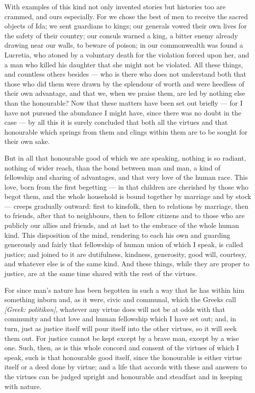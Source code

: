  With examples of this kind not only invented stories but histories too are crammed, and ours especially. For we chose the best of men to receive the sacred objects of Ida; we sent guardians to kings; our generals vowed their own lives for the safety of their country; our consuls warned a king, a bitter enemy already drawing near our walls, to beware of poison; in our commonwealth was found a Lucretia, who atoned by a voluntary death for the violation forced upon her, and a man who killed his daughter that she might not be violated. All these things, and countless others besides — who is there who does not understand both that those who did them were drawn by the splendour of worth and were heedless of their own advantage, and that we, when we praise them, are led by nothing else than the honourable? Now that these matters have been set out briefly — for I have not pursued the abundance I might have, since there was no doubt in the case — by all this it is surely concluded that both all the virtues and that honourable which springs from them and clings within them are to be sought for their own sake.

 But in all that honourable good of which we are speaking, nothing is so radiant, nothing of wider reach, than the bond between man and man, a kind of fellowship and sharing of advantages, and that very love of the human race. This love, born from the first begetting — in that children are cherished by those who begot them, and the whole household is bound together by marriage and by stock — creeps gradually outward: first to kinsfolk, then to relations by marriage, then to friends, after that to neighbours, then to fellow citizens and to those who are publicly our allies and friends, and at last to the embrace of the whole human kind. This disposition of the mind, rendering to each his own and guarding generously and fairly that fellowship of human union of which I speak, is called justice; and joined to it are dutifulness, kindness, generosity, good will, courtesy, and whatever else is of the same kind. And these things, while they are proper to justice, are at the same time shared with the rest of the virtues.

 For since man's nature has been begotten in such a way that he has within him something inborn and, as it were, civic and communal, which the Greeks call \textit{[Greek: politikon]}, whatever any virtue does will not be at odds with that community and that love and human fellowship which I have set out; and, in turn, just as justice itself will pour itself into the other virtues, so it will seek them out. For justice cannot be kept except by a brave man, except by a wise one. Such, then, as is this whole concord and consent of the virtues of which I speak, such is that honourable good itself, since the honourable is either virtue itself or a deed done by virtue; and a life that accords with these and answers to the virtues can be judged upright and honourable and steadfast and in keeping with nature.


